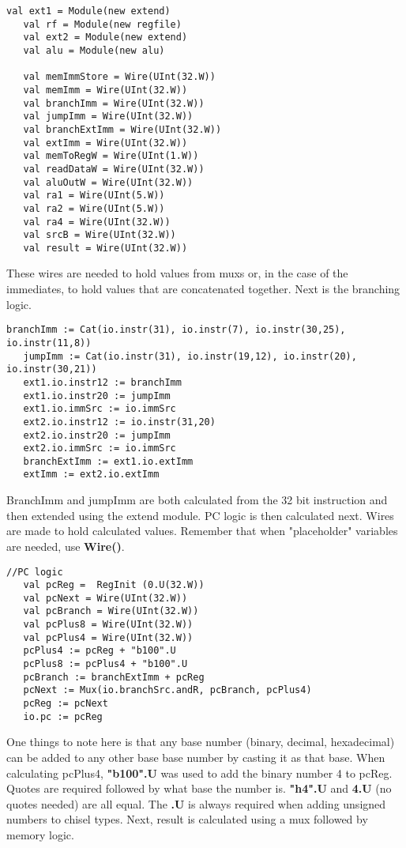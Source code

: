 \documentclass[12pt, letterpaper]{report}
\begin{document}
\begin{lstlisting}[style=scala]
   val ext1 = Module(new extend)
   val rf = Module(new regfile)
   val ext2 = Module(new extend)
   val alu = Module(new alu)

   val memImmStore = Wire(UInt(32.W))
   val memImm = Wire(UInt(32.W))
   val branchImm = Wire(UInt(32.W))
   val jumpImm = Wire(UInt(32.W))
   val branchExtImm = Wire(UInt(32.W))
   val extImm = Wire(UInt(32.W))
   val memToRegW = Wire(UInt(1.W))
   val readDataW = Wire(UInt(32.W))
   val aluOutW = Wire(UInt(32.W))
   val ra1 = Wire(UInt(5.W))
   val ra2 = Wire(UInt(5.W))
   val ra4 = Wire(UInt(32.W))
   val srcB = Wire(UInt(32.W))
   val result = Wire(UInt(32.W))
\end{lstlisting}

These wires are needed to hold values from muxs or, in the case of the immediates, to hold values that are concatenated together.
Next is the branching logic.

\begin{lstlisting}[style=scala]
   branchImm := Cat(io.instr(31), io.instr(7), io.instr(30,25), io.instr(11,8))
   jumpImm := Cat(io.instr(31), io.instr(19,12), io.instr(20), io.instr(30,21))
   ext1.io.instr12 := branchImm
   ext1.io.instr20 := jumpImm
   ext1.io.immSrc := io.immSrc
   ext2.io.instr12 := io.instr(31,20) 
   ext2.io.instr20 := jumpImm
   ext2.io.immSrc := io.immSrc
   branchExtImm := ext1.io.extImm
   extImm := ext2.io.extImm
\end{lstlisting}

BranchImm and jumpImm are both calculated from the 32 bit instruction and then extended using the extend module.
PC logic is then calculated next. Wires are made to hold calculated values. Remember that when "placeholder" variables are
needed, use \textbf{Wire()}. 

\begin{lstlisting}[style=scala]
   //PC logic
   val pcReg =  RegInit (0.U(32.W))
   val pcNext = Wire(UInt(32.W))
   val pcBranch = Wire(UInt(32.W))
   val pcPlus8 = Wire(UInt(32.W))
   val pcPlus4 = Wire(UInt(32.W))
   pcPlus4 := pcReg + "b100".U
   pcPlus8 := pcPlus4 + "b100".U
   pcBranch := branchExtImm + pcReg
   pcNext := Mux(io.branchSrc.andR, pcBranch, pcPlus4)
   pcReg := pcNext
   io.pc := pcReg
\end{lstlisting}

One things to note here is that any base number (binary, decimal, hexadecimal) can be added to 
any other base base number by casting it as that base. When calculating pcPlus4, \textbf{"b100".U}
was used to add the binary number 4 to pcReg. Quotes are required followed by what base the number is.
\textbf{"h4".U} and \textbf{4.U} (no quotes needed) are all equal. The \textbf{.U} is always required when 
adding unsigned numbers to chisel types. Next, result is calculated using a mux followed by memory logic.
\end{document}
